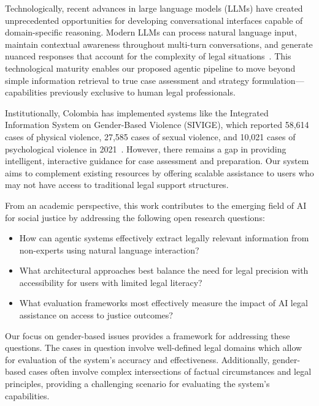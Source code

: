 Technologically, recent advances in large language models (LLMs) 
have created unprecedented opportunities for developing conversational 
interfaces capable of domain-specific reasoning. Modern LLMs can 
process natural language input, maintain contextual awareness 
throughout multi-turn conversations, and generate nuanced 
responses that account for the complexity of legal 
situations~\cite{darrow2023}. This technological maturity 
enables our proposed agentic pipeline to move beyond simple 
information retrieval to true case assessment and strategy 
formulation—capabilities previously exclusive to human legal 
professionals.

Institutionally, Colombia has implemented systems like the 
Integrated Information System on Gender-Based Violence (SIVIGE), 
which reported 58,614 cases of physical violence, 27,585 cases of 
sexual violence, and 10,021 cases of psychological violence in 
2021~\cite{advocates2023}. However, there remains a gap in 
providing intelligent, interactive guidance for case assessment 
and preparation. Our system aims to complement existing resources 
by offering scalable assistance to users who may not have access 
to traditional legal support structures.

From an academic perspective, this work contributes to the 
emerging field of AI for social justice by addressing the following 
open research questions:

\begin{itemize}
\item How can agentic systems effectively extract legally relevant information from non-experts using natural language interaction?
\item What architectural approaches best balance the need for legal precision with accessibility for users with limited legal literacy?
\item What evaluation frameworks most effectively measure the impact of AI legal assistance on access to justice outcomes?
\end{itemize}

Our focus on gender-based issues provides a framework for addressing these questions. The cases in question involve well-defined legal domains which allow for evaluation of the system's accuracy and effectiveness. 
Additionally, gender-based cases 
often involve complex intersections of factual circumstances 
and legal principles, providing a 
challenging scenario for evaluating 
the system’s capabilities.

